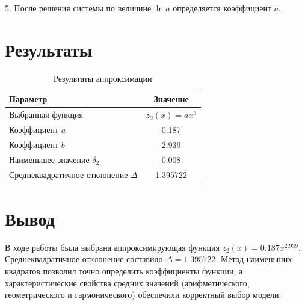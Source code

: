 \documentclass[a4paper, 14pt]{extarticle}
\begin{document}
5. После решения системы по величине \(\ln a\) определяется коэффициент \(a\).

\section{Результаты}

\begin{table}[H]
    \centering
    \caption{Результаты аппроксимации}
    \begin{tabular}{lc}
    \toprule
    Параметр & Значение \\
    \midrule
    Выбранная функция & \( z_2(x) = ax^b \) \\
    Коэффициент \( a \) & 0.187 \\
    Коэффициент \( b \) & 2.939 \\
    Наименьшее значение \( \delta_2 \) & 0.008 \\
    Среднеквадратичное отклонение \( \Delta \) & 1.395722 \\
    \bottomrule
    \end{tabular}
\end{table}

\section{Вывод}

В ходе работы была выбрана аппроксимирующая функция \( z_2(x) = 0.187x^{2.939} \). Среднеквадратичное отклонение составило \( \Delta = 1.395722 \). Метод наименьших квадратов позволил точно определить коэффициенты функции, а характеристические свойства средних значений (арифметического, геометрического и гармонического) обеспечили корректный выбор модели.
\end{document}
